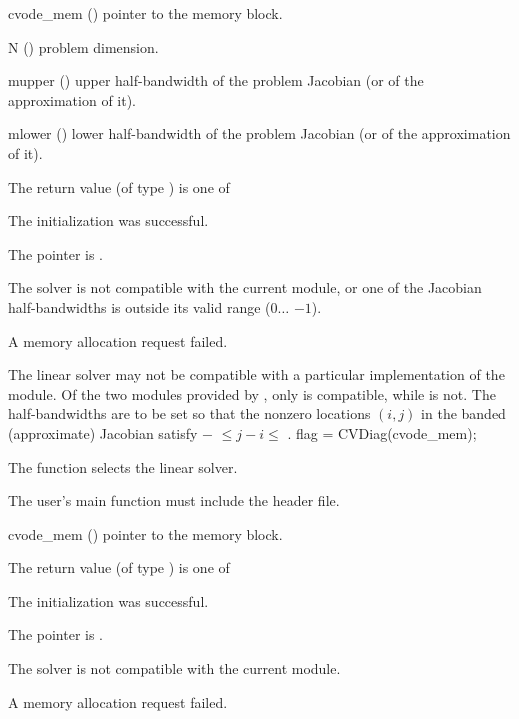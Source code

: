 {
  \begin{args}
  \item[cvode\_mem] ()
    pointer to the {\cvode} memory block.
  \item[N] ()
    problem dimension.
  \item[mupper] ()
    upper half-bandwidth of the problem Jacobian (or of the approximation of it).
  \item[mlower] ()
    lower half-bandwidth of the problem Jacobian (or of the approximation of it).
  \end{args}
}
{
  The return value  (of type ) is one of
  \begin{args}
  \item[\Id{CVBAND\_SUCCESS}] 
    The {\cvband} initialization was successful.
  \item[\Id{CVBAND\_MEM\_NULL}]
    The  pointer is .
  \item[\Id{CVBAND\_ILL\_INPUT}]
    The {\cvband} solver is not compatible with the current {\nvector} module, or
    one of the Jacobian half-bandwidths is outside its valid range
    ($0 \ldots$ $-1$).
  \item[\Id{CVBAND\_MEM\_FAIL}]
    A memory allocation request failed.
  \end{args}
}
{
  The {\cvband} linear solver may not be compatible with a particular
  implementation of the {\nvector} module. Of the two {\nvector} modules 
  provided by {\sundials}, only {\nvecs} is compatible, while {\nvecp} is not.
  The half-bandwidths are to be set so that the nonzero locations $(i,j)$ in the
  banded (approximate) Jacobian satisfy $-$ $\leq j-i \leq$ .
}
{
  flag = CVDiag(cvode\_mem);
}
{
  The function  selects the {\cvdiag} linear solver. 

  The user's main function must include the  header file.
}
{
  \begin{args}
  \item[cvode\_mem] ()
    pointer to the {\cvode} memory block.
  \end{args}
}
{
  The return value  (of type ) is one of
  \begin{args}
  \item[\Id{CVDIAG\_SUCCESS}]
    The {\cvdiag} initialization was successful.
  \item[\Id{CVDIAG\_MEM\_NULL}]
    The  pointer is .
  \item[\Id{CVDIAG\_ILL\_INPUT}]
    The {\cvdiag} solver is not compatible with the current {\nvector} module.
  \item[\Id{CVDIAG\_MEM\_FAIL}]
    A memory allocation request failed.
  \end{args}
}
